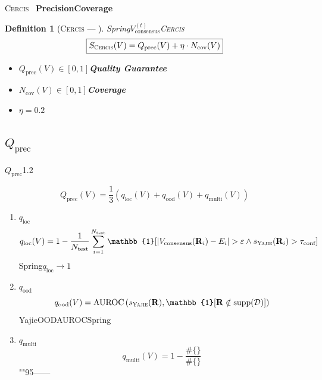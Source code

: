\documentclass[12pt,a4paper]{article}
\newtheorem{definition}[theorem]{Definition}
\theoremstyle{remark}
\newcommand{\D}{\mathcal{D}}
\newcommand{\Yajie}{\textsc{Yajie}}
\newcommand{\Cercis}{\textsc{Cercis}}
\begin{document}
\Cercis{}~\cite{scx_ml_audit}
\textbf{Precision}\textbf{Coverage}

\begin{definition}[\Cercis{} — ]\label{def:cercis_potential}
Spring$V^{(t)}_{\text{consensus}}$\Cercis{}
\begin{equation}\label{eq:cercis_potential}
    \boxed{S_{\Cercis}(V) = Q_{\text{prec}}(V) + \eta \cdot N_{\text{cov}}(V)}
\end{equation}

\begin{itemize}[nosep]
    \item $Q_{\text{prec}}(V) \in [0,1]$\textbf{Quality Guarantee}
    \item $N_{\text{cov}}(V) \in [0,1]$\textbf{Coverage}
    \item $\eta = 0.2$\textbf{}
\end{itemize}
\end{definition}

\subsection{$Q_{\text{prec}}$}

$Q_{\text{prec}}$1.2

\begin{equation}\label{eq:Q_decomposition}
    Q_{\text{prec}}(V) = \frac{1}{3}\left(q_{\text{loc}}(V) + q_{\text{ood}}(V) + q_{\text{multi}}(V)\right)
\end{equation}

\begin{enumerate}[label=(\arabic*),leftmargin=*,itemsep=4pt]
    \item \textbf{$q_{\text{loc}}$}
    \[
    q_{\text{loc}}(V) = 1 - \frac{1}{N_{\text{test}}}\sum_{i=1}^{N_{\text{test}}} \mathbb{1}[|V_{\text{consensus}}(\mathbf{R}_i) - E_i| > \varepsilon \land s_{\Yajie}(\mathbf{R}_i) > \tau_{\text{conf}}]
    \]
    \textit{}Spring$q_{\text{loc}} \to 1$

    \item \textbf{$q_{\text{ood}}$}
    \[
    q_{\text{ood}}(V) = \text{AUROC}\left(s_{\Yajie}(\mathbf{R}), \mathbb{1}[\mathbf{R} \notin \text{supp}(\D)]\right)
    \]
    YajieOODAUROCSpring

    \item \textbf{$q_{\text{multi}}$}
    \[
    q_{\text{multi}}(V) = 1 - \frac{\#\{\text{}\}}{\#\{\text{}\}}
    \]
    ""95——
\end{enumerate}
\end{document}
